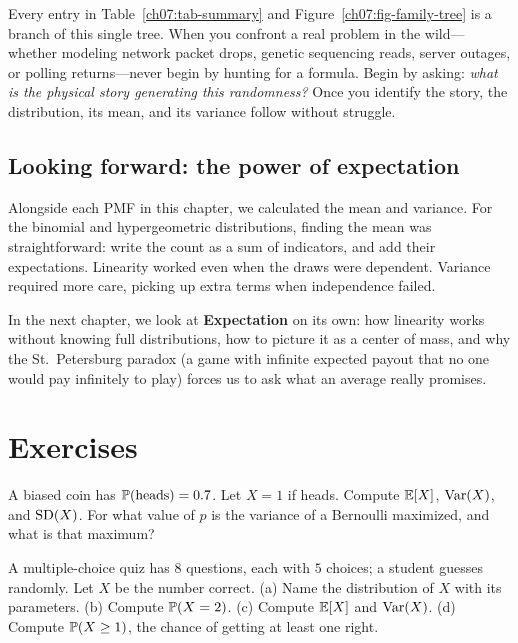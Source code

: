 Every entry in Table~\ref{ch07:tab-summary} and Figure~\ref{ch07:fig-family-tree} is a branch of this single tree. When you confront a real problem in the wild---whether modeling network packet drops, genetic sequencing reads, server outages, or polling returns---never begin by hunting for a formula. Begin by asking: \emph{what is the physical story generating this randomness?} Once you identify the story, the distribution, its mean, and its variance follow without struggle.

\subsection{Looking forward: the power of expectation}
\label{ch07:bridge-to-expectation}

Alongside each PMF in this chapter, we calculated the mean and variance. For the
binomial and hypergeometric distributions, finding the mean was straightforward: write
the count as a sum of indicators, and add their expectations. Linearity worked even
when the draws were dependent. Variance required more care, picking up extra terms
when independence failed.

In the next chapter, we look at \textbf{Expectation} on its own: how linearity works
without knowing full distributions, how to picture it as a center of mass, and why the
St.~Petersburg paradox (a game with infinite expected payout that no one would pay infinitely to play) forces us to ask what an average really promises.

\section{Exercises}
\label{ch07:exercises}

\begin{exercise}
\label{ch07:exr-bern}
A biased coin has $\P(\text{heads}) = 0.7$. Let $X = 1$ if heads. Compute $\E[X]$,
$\Var(X)$, and $\SD(X)$. For what value of $p$ is the variance of a Bernoulli
maximized, and what is that maximum?
\end{exercise}

\begin{exercise}
\label{ch07:exr-binom}
A multiple-choice quiz has $8$ questions, each with $5$ choices; a student guesses
randomly. Let $X$ be the number correct.
(a) Name the distribution of $X$ with its parameters.
(b) Compute $\P(X = 2)$.
(c) Compute $\E[X]$ and $\Var(X)$.
(d) Compute $\P(X \ge 1)$, the chance of getting at least one right.
\end{exercise}

